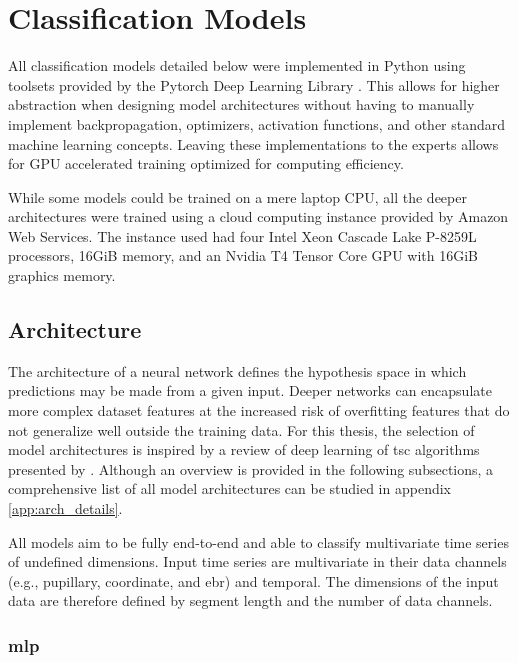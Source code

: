\section{Classification Models} \label{sec:impl/clf_models}

All classification models detailed below were implemented in Python using toolsets provided by the Pytorch Deep Learning Library \cite{paszke2019}. This allows for higher abstraction when designing model architectures without having to manually implement backpropagation, optimizers, activation functions, and other standard machine learning concepts. Leaving these implementations to the experts allows for GPU accelerated training optimized for computing efficiency.

While some models could be trained on a mere laptop CPU, all the deeper architectures were trained using a cloud computing instance provided by Amazon Web Services. The instance used had four Intel Xeon Cascade Lake P-8259L processors, 16GiB memory, and an Nvidia T4 Tensor Core GPU with 16GiB graphics memory.

\subsection{Architecture}

The architecture of a neural network defines the hypothesis space in which predictions may be made from a given input. Deeper networks can encapsulate more complex dataset features at the increased risk of overfitting features that do not generalize well outside the training data. For this thesis, the selection of model architectures is inspired by a review of deep learning of \acrshort{tsc} algorithms presented by \textcite{fawaz2018}. Although an overview is provided in the following subsections, a comprehensive list of all model architectures can be studied in appendix \ref{app:arch_details}.

All models aim to be fully end-to-end and able to classify multivariate time series of undefined dimensions. Input time series are multivariate in their data channels (e.g., pupillary, coordinate, and \acrshort{ebr}) and temporal. 
The dimensions of the input data are therefore defined by segment length and the number of data channels.

\newpage
\subsubsection{\acrlong{mlp}}

